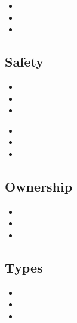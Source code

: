 \documentclass[xcolor={svgnames},hyperref]{beamer}
\begin{document}
    \begin{frame}
        \begin{itemize}
            \item
            \item
            \item
        \end{itemize}
    \end{frame}

\subsection{Safety}

    \begin{frame}
        \begin{itemize}
            \item
            \item
            \item
        \end{itemize}
    \end{frame}


    \begin{frame}
        \begin{itemize}
            \item
            \item
            \item
        \end{itemize}
    \end{frame}



\subsection{Ownership}

    \begin{frame}
        \begin{itemize}
            \item
            \item
            \item
        \end{itemize}
    \end{frame}


\subsection{Types}

    \begin{frame}
        \begin{itemize}
            \item
            \item
            \item
        \end{itemize}
    \end{frame}
\end{document}
